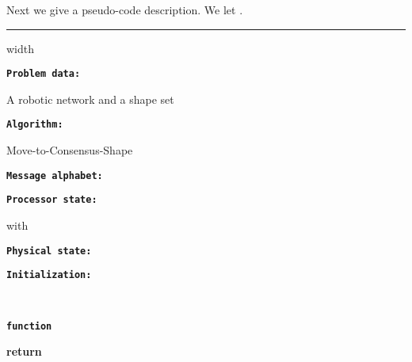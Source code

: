 \documentclass[onecolumn,journal,letterpaper]{IEEEtran}
\begin{document}
Next we give a pseudo-code description.  We let
.

\bigskip\bigskip
\bigskip \hrule width \linewidth \smallskip

\noindent\begin{minipage}{0.44\linewidth}\textbf{\texttt{Problem data:}}\end{minipage}\begin{minipage}[t]{0.56\linewidth} A robotic network and a shape set\end{minipage}

\noindent\begin{minipage}{0.44\linewidth}\textbf{\texttt{Algorithm:}}\end{minipage}\begin{minipage}{0.56\linewidth}Move-to-Consensus-Shape\end{minipage}

\noindent\begin{minipage}{0.44\linewidth}\textbf{\texttt{Message
      alphabet:}}\end{minipage}\begin{minipage}{0.56\linewidth}\end{minipage}

\noindent\begin{minipage}{0.44\linewidth}\textbf{\texttt{Processor
      state:}}\end{minipage}\begin{minipage}[t]{0.56\linewidth}
   with \\
\end{minipage}

\noindent\begin{minipage}{0.44\linewidth}\textbf{\texttt{Physical
      state:}}\end{minipage}\begin{minipage}[t]{0.56\linewidth}
  
\end{minipage}

\smallskip
\noindent\begin{minipage}{0.44\linewidth}\textbf{\texttt{Initialization:}}\end{minipage}\begin{minipage}[t]{0.56\linewidth}
  \\
  
\end{minipage}

\bigskip

\noindent\textbf{\texttt{function}}   \begin{algorithmic}[1]
  \STATE \textbf{return} 
\end{algorithmic}
\end{document}
